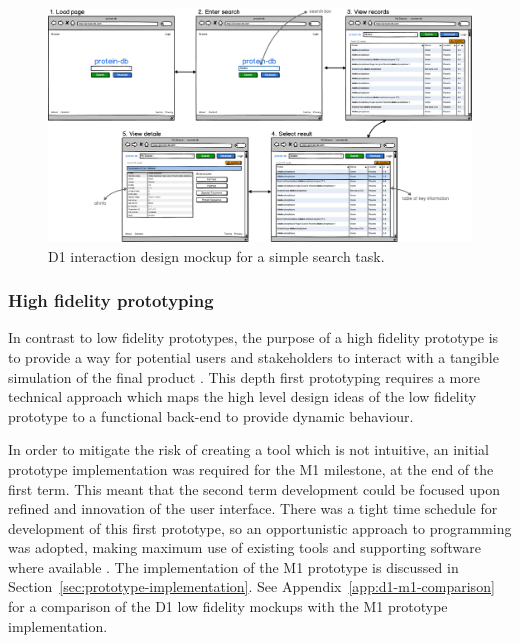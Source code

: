 \begin{figure}[H]
\centering
    \includegraphics[width=\textwidth]{assets/d1-search}
\caption[D1 interaction design mockup for a simple search task]
        {D1 interaction design mockup for a simple search task.}
\label{fig:d1-search}
\end{figure}


\subsubsection*{High fidelity prototyping}

In contrast to low fidelity prototypes, the purpose of a high fidelity
prototype is to provide a way for potential users and stakeholders to
interact with a tangible simulation of the final product
\cite{egger2000lofi}. This depth first prototyping requires a more
technical approach which maps the high level design ideas of the low
fidelity prototype to a functional back-end to provide dynamic
behaviour.

In order to mitigate the risk of creating a tool which is not
intuitive, an initial prototype implementation was required for the M1
milestone, at the end of the first term. This meant that the second
term development could be focused upon refined and innovation of the
user interface. There was a tight time schedule for development of
this first prototype, so an opportunistic approach to programming was
adopted, making maximum use of existing tools and supporting software
where available \cite{brandt2008opportunistic}. The implementation of
the M1 prototype is discussed in
Section~\ref{sec:prototype-implementation}. See
Appendix~\ref{app:d1-m1-comparison} for a comparison of the D1 low
fidelity mockups with the M1 prototype implementation.
